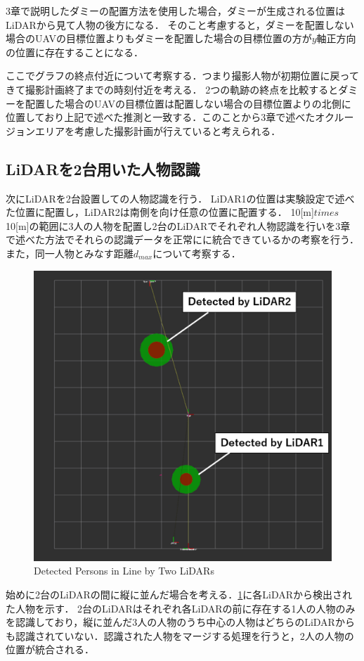\documentclass[autodetect-engine,dvipdfmx-if-dvi,ja=standard,a4j,jbase=11pt,magstyle=nomag*]{bxjsreport}
\begin{document}
3章で説明したダミーの配置方法を使用した場合，ダミーが生成される位置はLiDARから見て人物の後方になる．
そのこと考慮すると，ダミーを配置しない場合のUAVの目標位置よりもダミーを配置した場合の目標位置の方が$y$軸正方向の位置に存在することになる．

ここでグラフの終点付近について考察する．つまり撮影人物が初期位置に戻ってきて撮影計画終了までの時刻付近を考える．
2つの軌跡の終点を比較するとダミーを配置した場合のUAVの目標位置は配置しない場合の目標位置よりの北側に位置しており上記で述べた推測と一致する．このことから3章で述べたオクルージョンエリアを考慮した撮影計画が行えていると考えられる．


\subsection{LiDARを2台用いた人物認識}
次にLiDARを2台設置しての人物認識を行う．
LiDAR1の位置は実験設定で述べた位置に配置し，LiDAR2は南側を向け任意の位置に配置する．
10[m]$times$10[m]の範囲に3人の人物を配置し2台のLiDARでそれぞれ人物認識を行いを3章で述べた方法でそれらの認識データを正常にに統合できているかの考察を行う．また，同一人物とみなす距離$d_{max}$について考察する．

\begin{figure}[h]
    \centering
    \includegraphics[width=0.5\linewidth, clip]{./figure/chapter5/line.png}
    \caption{Detected Persons in Line by Two LiDARs}
    \label{fig:line}
\end{figure}

始めに2台のLiDARの間に縦に並んだ場合を考える．\cref{fig:line}に各LiDARから検出された人物を示す．
2台のLiDARはそれぞれ各LiDARの前に存在する1人の人物のみを認識しており，縦に並んだ3人の人物のうち中心の人物はどちらのLiDARからも認識されていない．認識された人物をマージする処理を行うと，2人の人物の位置が統合される．
\end{document}
